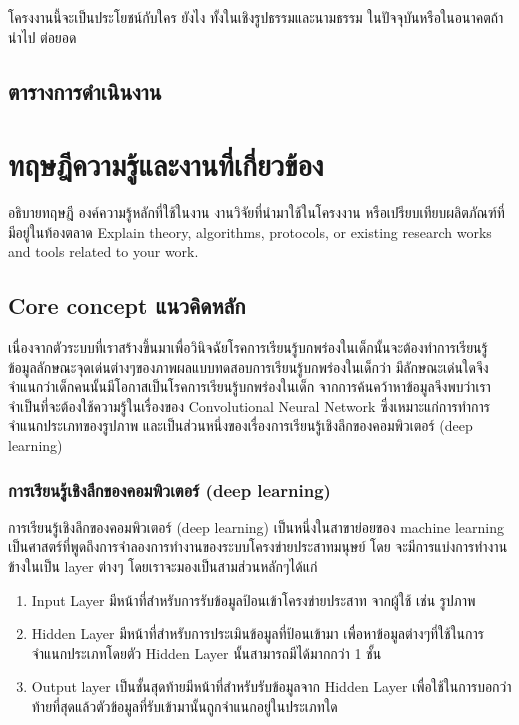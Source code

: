\documentclass[12pt,oneside,openright,a4paper]{cpe-thai-project}
\begin{document}
โครงงานนี้จะเป็นประโยชน์กับใคร ยังไง ทั้งในเชิงรูปธรรมและนามธรรม ในปัจจุบันหรือในอนาคตถ้านำไป
ต่อยอด

\section{ตารางการดำเนินงาน}

\chapter{ทฤษฎีความรู้และงานที่เกี่ยวข้อง}

อธิบายทฤษฎี องค์ความรู้หลักที่ใช้ในงาน งานวิจัยที่นำมาใช้ในโครงงาน หรือเปรียบเทียบผลิตภัณฑ์ที่มีอยู่ในท้องตลาด
Explain theory, algorithms, protocols, or existing research works and tools related to your work. 

\section{Core concept แนวคิดหลัก}
เนื่องจากตัวระบบที่เราสร้างขึ้นมาเพื่อวินิจฉัยโรคการเรียนรู้บกพร่องในเด็กนั้นจะต้องทำการเรียนรู้ข้อมูลลักษณะจุดเด่นต่างๆของภาพผลแบบทดสอบการเรียนรู้บกพร่องในเด็กว่า 
มีลักษณะเด่นใดจึงจำแนกว่าเด็กคนนั้นมีโอกาสเป็นโรคการเรียนรู้บกพร่องในเด็ก 
จากการค้นคว้าหาข้อมูลจึงพบว่าเราจำเป็นที่จะต้องใช้ความรู้ในเรื่องของ Convolutional Neural Network 
ซึ่งเหมาะแก่การทำการจำแนกประเภทของรูปภาพ และเป็นส่วนหนึ่งของเรื่องการเรียนรู้เชิงลึกของคอมพิวเตอร์ (deep learning)

\subsection{การเรียนรู้เชิงลึกของคอมพิวเตอร์ (deep learning)}

\par การเรียนรู้เชิงลึกของคอมพิวเตอร์ (deep learning) เป็นหนึ่งในสาขาย่อยของ machine learning เป็นศาสตร์ที่พูดถึงการจำลองการทำงานของระบบโครงข่ายประสาทมนุษย์ โดย จะมีการแบ่งการทำงานข้างในเป็น layer ต่างๆ โดยเราจะมองเป็นสามส่วนหลักๆได้แก่ 	

\begin{enumerate}
  \item Input Layer มีหน้าที่สำหรับการรับข้อมูลป้อนเข้าโครงข่ายประสาท จากผู้ใช้ เช่น รูปภาพ
  \item Hidden Layer มีหน้าที่สำหรับการประเมินข้อมูลที่ป้อนเข้ามา เพื่อหาข้อมูลต่างๆที่ใช้ในการจำแนกประเภทโดยตัว Hidden Layer นั้นสามารถมีได้มากกว่า 1 ชั้น
  \item Output layer เป็นชั้นสุดท้ายมีหน้าที่สำหรับรับข้อมูลจาก Hidden Layer เพื่อใช้ในการบอกว่าท้ายที่สุดแล้วตัวข้อมูลที่รับเข้ามานั้นถูกจำแนกอยู่ในประเภทใด
\end{enumerate}
\end{document}
